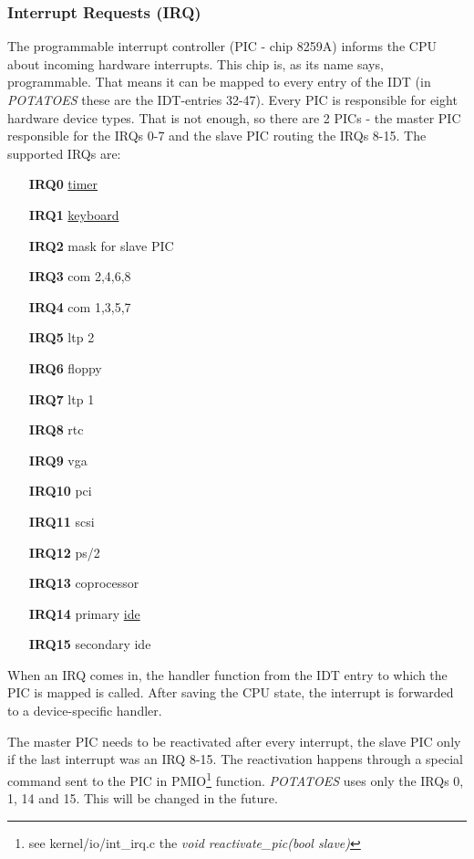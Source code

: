 \documentclass[11pt,a4paper]{scrartcl}
\begin{document}
\subsubsection{Interrupt Requests (IRQ)}
The programmable interrupt controller (PIC - chip 8259A) informs the CPU about incoming hardware interrupts. This chip is, as its name says, programmable. That means it can be mapped to every entry of the IDT (in \textit{POTATOES} these are the IDT-entries 32-47). Every PIC is responsible for eight hardware device types. That is not enough, so there are 2 PICs - the master PIC responsible for the IRQs 0-7 and the slave PIC routing the IRQs 8-15. The supported IRQs are:
\begin{enumerate}
\item[\textbf{IRQ0}] \hyperlink{TIMER}{timer}
\item[\textbf{IRQ1}] \hyperlink{KEYBOARD}{keyboard}
\item[\textbf{IRQ2}] mask for slave PIC
\item[\textbf{IRQ3}] com 2,4,6,8
\item[\textbf{IRQ4}] com 1,3,5,7
\item[\textbf{IRQ5}] ltp 2
\item[\textbf{IRQ6}] floppy
\item[\textbf{IRQ7}] ltp 1
\item[\textbf{IRQ8}] rtc
\item[\textbf{IRQ9}] vga
\item[\textbf{IRQ10}] pci
\item[\textbf{IRQ11}] scsi
\item[\textbf{IRQ12}] ps/2
\item[\textbf{IRQ13}] coprocessor
\item[\textbf{IRQ14}] primary \hyperlink{IDE}{ide}
\item[\textbf{IRQ15}] secondary ide
\end{enumerate}
When an IRQ comes in, the handler function from the IDT entry to which the PIC is mapped is called. After saving the CPU state, the interrupt is forwarded to a device-specific handler.

The master PIC needs to be reactivated after every interrupt, the slave PIC only if the last interrupt was an IRQ 8-15. The reactivation happens through a special command sent to the PIC in PMIO\footnote{see {kernel/io/int\_irq.c} the \textit{void reactivate\_pic(bool slave)}} function. \textit{POTATOES} uses only the IRQs 0, 1, 14 and 15. This will be changed in the future.
\end{document}
